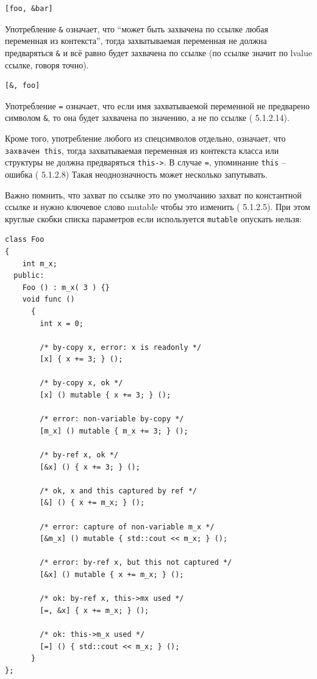 \documentclass[a4paper,12pt,oneside]{article}
\begin{document}
\begin{lstlisting}
[foo, &bar]
\end{lstlisting}

Употребление \lstinline!&! означает, что ``может быть захвачена по ссылке любая переменная из контекста'', тогда захватываемая переменная не должна предваряться \lstinline!&! и всё равно будет захвачена по ссылке (по ссылке значит по lvalue ссылке, говоря точно).

\begin{lstlisting}
[&, foo]
\end{lstlisting}

Употребление \lstinline!=! означает, что если имя захватываемой переменной не предварено символом \lstinline!&!, то она будет захвачена по значению, а не по ссылке (\cite{stdcpp14} 5.1.2.14). 

Кроме того, употребление любого из спецсимволов отдельно, означает, что \lstinline!захвачен this!, тогда захватываемая переменная из контекста класса или структуры не должна предваряться \lstinline!this->!. В случае \lstinline!=!, упоминание \lstinline!this! -- ошибка (\cite{stdcpp14} 5.1.2.8)  Такая неоднозначность может несколько запутывать.

Важно помнить, что захват по ссылке это по умолчанию захват по константной ссылке и нужно ключевое слово mutable чтобы это изменить (\cite{stdcpp14} 5.1.2.5). При этом круглые скобки списка параметров если используется \lstinline!mutable! опускать нельзя:

\begin{lstlisting}
class Foo
{
    int m_x;
  public:
    Foo () : m_x( 3 ) {}
    void func ()
      {
        int x = 0;

        /* by-copy x, error: x is readonly */
        [x] { x += 3; } ();
        
        /* by-copy x, ok */
        [x] () mutable { x += 3; } ();

        /* error: non-variable by-copy */
        [m_x] () mutable { m_x += 3; } (); 

        /* by-ref x, ok */
        [&x] () { x += 3; } ();

        /* ok, x and this captured by ref */
        [&] () { x += m_x; } ();

        /* error: capture of non-variable m_x */
        [&m_x] () mutable { std::cout << m_x; } (); 

        /* error: by-ref x, but this not captured */
        [&x] () mutable { x += m_x; } (); 

        /* ok: by-ref x, this->mx used */
        [=, &x] { x += m_x; } ();

        /* ok: this->m_x used */
        [=] () { std::cout << m_x; } ();
      }
};
\end{lstlisting}
\end{document}
